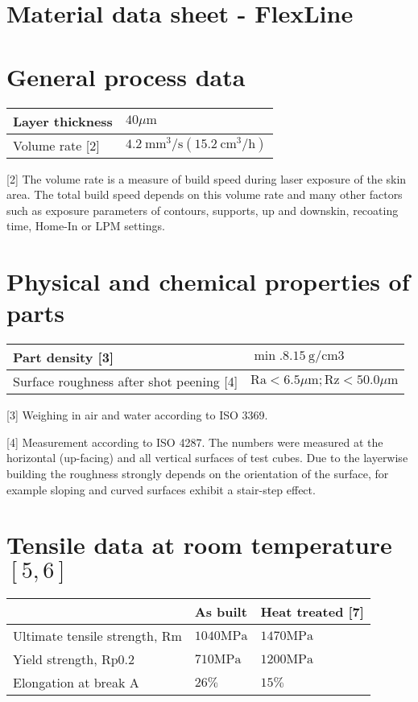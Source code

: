 \documentclass[10pt]{article}
\begin{document}
\section*{Material data sheet - FlexLine}
\section*{General process data}
\begin{center}
\begin{tabular}{ll}
\hline
Layer thickness & $40 \mu \mathrm{m}$ \\
\hline
Volume rate [2] & $4.2 \mathrm{~mm}^{3} / \mathrm{s}\left(15.2 \mathrm{~cm}^{3} / \mathrm{h}\right)$ \\
\hline
\end{tabular}
\end{center}

[2] The volume rate is a measure of build speed during laser exposure of the skin area. The total build speed depends on this volume rate and many other factors such as exposure parameters of contours, supports, up and downskin, recoating time, Home-In or LPM settings.

\section*{Physical and chemical properties of parts}
\begin{center}
\begin{tabular}{ll}
\hline
Part density [3] & $\min .8 .15 \mathrm{~g} / \mathrm{cm} 3$ \\
\hline
Surface roughness after shot peening [4] & $\mathrm{Ra}<6.5 \mu \mathrm{m} ; \mathrm{Rz}<50.0 \mu \mathrm{m}$ \\
\hline
\end{tabular}
\end{center}

[3] Weighing in air and water according to ISO 3369.

[4] Measurement according to ISO 4287. The numbers were measured at the horizontal (up-facing) and all vertical surfaces of test cubes. Due to the layerwise building the roughness strongly depends on the orientation of the surface, for example sloping and curved surfaces exhibit a stair-step effect.

\section*{Tensile data at room temperature $[5,6]$}
\begin{center}
\begin{tabular}{lll}
\hline
 & As built & Heat treated [7] \\
\hline
Ultimate tensile strength, Rm & $1040 \mathrm{MPa}$ & $1470 \mathrm{MPa}$ \\
\hline
Yield strength, Rp0.2 & $710 \mathrm{MPa}$ & $1200 \mathrm{MPa}$ \\
\hline
Elongation at break A & $26 \%$ & $15 \%$ \\
\hline
\end{tabular}
\end{center}
\end{document}
